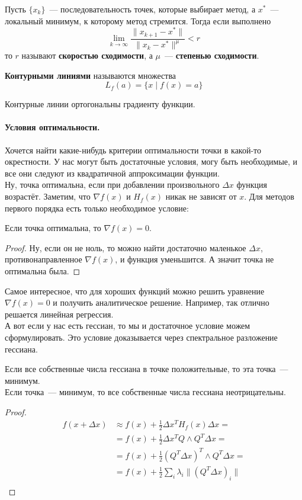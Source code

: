 \documentclass{article}
\begin{document}
    \begin{definition}
        Пусть $\{x_k\}$~--- последовательность точек, которые выбирает метод, а $x^*$~--- локальный минимум, к которому метод стремится. Тогда если выполнено
        \[
        \lim\limits_{k\to\infty}\frac{\|x_{k+1}-x^*\|}{\|x_k-x^*\|^\mu}<r
        \]
        то $r$ называют \textbf{скоростью сходимости}, а $\mu$~--- \textbf{степенью сходимости}.
    \end{definition}
    \begin{definition}
        \textbf{Контурными линиями} называются множества
        \[
        L_f(a)=\{x\mid f(x)=a\}
        \]
    \end{definition}
    \begin{claim}
        Контурные линии ортогональны градиенту функции.
    \end{claim}
    \paragraph{Условия оптимальности.}
    Хочется найти какие-нибудь критерии оптимальности точки в какой-то окрестности. У нас могут быть достаточные условия, могу быть необходимые, и все они следуют из квадратичной аппроксимации функции.\\
    Ну, точка оптимальна, если при добавлении произвольного $\Delta x$ функция возрастёт. Заметим, что $\nabla f(x)$ и $H_f(x)$ никак не зависят от $x$. Для методов первого порядка есть только необходимое условие:
    \begin{theorem}
        Если точка оптимальна, то $\nabla f(x)=0$.
    \end{theorem}
    \begin{proof}
        Ну, если он не ноль, то можно найти достаточно маленькое $\Delta x$, противонаправленное $\nabla f(x)$, и функция уменьшится. А значит точка не оптимальна была.
    \end{proof}\noindent
    Самое интересное, что для хороших функций можно решить уравнение $\nabla f(x)=0$ и получить аналитическое решение. Например, так отлично решается линейная регрессия.\\
    А вот если у нас есть гессиан, то мы и достаточное условие можем сформулировать. Это условие доказывается через спектральное разложение гессиана.
    \begin{theorem}
        Если все собственные числа гессиана в точке положительные, то эта точка~--- минимум.\\
        Если точка~--- минимум, то все собственные числа гессиана неотрицательны.
    \end{theorem}
    \begin{proof}
        \[\begin{split}
            f(x+\Delta x)&\approx f(x)+\frac12\Delta x^TH_f(x)\Delta x=\\
            &=f(x)+\frac12\Delta x^TQ\land Q^T\Delta x=\\
            &=f(x)+\frac12(Q^T\Delta x)^T\land Q^T\Delta x=\\
            &=f(x)+\frac12\sum\limits_i\lambda_i\|(Q^T\Delta x)_i\|\\
        \end{split}\]
    \end{proof}
\end{document}

